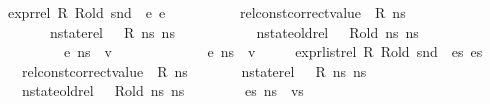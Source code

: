 \begin{isabellebody}
\ \ \ {\isachardoublequoteopen}expr{\isacharunderscore}{\kern0pt}rel\ R\ R{\isacharunderscore}{\kern0pt}old\ {\isacharparenleft}{\kern0pt}snd\ {\isasymLambda}{\isacharparenright}{\kern0pt}\ e{}\ e{}\ {\isasymLongrightarrow}\isanewline
\ \ \ \ \ \ \ \ \ rel{\isacharunderscore}{\kern0pt}const{\isacharunderscore}{\kern0pt}correct{\isacharunderscore}{\kern0pt}value\ {\isasymLambda}\ R\ ns{}\ {\isasymLongrightarrow}\ \isanewline
\ \ \ \ \ \ \ \ \ nstate{\isacharunderscore}{\kern0pt}rel\ {\isasymLambda}\ {\isasymLambda}{\isacharprime}{\kern0pt}\ R\ ns{}\ ns{}\ {\isasymLongrightarrow}\ \isanewline
\ \ \ \ \ \ \ \ \ nstate{\isacharunderscore}{\kern0pt}old{\isacharunderscore}{\kern0pt}rel\ {\isasymLambda}\ {\isasymLambda}{\isacharprime}{\kern0pt}\ R{\isacharunderscore}{\kern0pt}old\ ns{}\ ns{}\ {\isasymLongrightarrow}\isanewline
\ \ \ \ \ \ \ \ \ {\isasymLambda}{\isacharcomma}{\kern0pt}{\isasymGamma}{\isacharcomma}{\kern0pt}{\isasymOmega}\ {\isasymturnstile}\ {\isasymlangle}e{}{\isacharcomma}{\kern0pt}\ ns{}{\isasymrangle}\ {\isasymDown}\ v\ {\isasymLongrightarrow}\ \isanewline
\ \ \ \ \ \ \ \ \ {\isasymLambda}{\isacharprime}{\kern0pt}{\isacharcomma}{\kern0pt}{\isasymGamma}{\isacharcomma}{\kern0pt}{\isasymOmega}\ {\isasymturnstile}\ {\isasymlangle}e{}{\isacharcomma}{\kern0pt}\ ns{}{\isasymrangle}\ {\isasymDown}\ v{\isachardoublequoteclose}\ \isanewline
\ \ \ \ {\isachardoublequoteopen}expr{\isacharunderscore}{\kern0pt}list{\isacharunderscore}{\kern0pt}rel\ R\ R{\isacharunderscore}{\kern0pt}old\ {\isacharparenleft}{\kern0pt}snd\ {\isasymLambda}{\isacharparenright}{\kern0pt}\ es{}\ es{}\ {\isasymLongrightarrow}\isanewline
\ \ \ \ \ rel{\isacharunderscore}{\kern0pt}const{\isacharunderscore}{\kern0pt}correct{\isacharunderscore}{\kern0pt}value\ {\isasymLambda}\ R\ ns{}\ {\isasymLongrightarrow}\ \isanewline
\ \ \ \ \ nstate{\isacharunderscore}{\kern0pt}rel\ {\isasymLambda}\ {\isasymLambda}{\isacharprime}{\kern0pt}\ R\ ns{}\ ns{}\ {\isasymLongrightarrow}\ \isanewline
\ \ \ \ \ nstate{\isacharunderscore}{\kern0pt}old{\isacharunderscore}{\kern0pt}rel\ {\isasymLambda}\ {\isasymLambda}{\isacharprime}{\kern0pt}\ R{\isacharunderscore}{\kern0pt}old\ ns{}\ ns{}\ {\isasymLongrightarrow}\isanewline
\ \ \ \ \ {\isasymLambda}{\isacharcomma}{\kern0pt}{\isasymGamma}{\isacharcomma}{\kern0pt}{\isasymOmega}\ {\isasymturnstile}\ {\isasymlangle}es{}{\isacharcomma}{\kern0pt}\ ns{}{\isasymrangle}\ {\isacharbrackleft}{\kern0pt}{\isasymDown}{\isacharbrackright}{\kern0pt}\ vs\ {\isasymLongrightarrow}\ \isanewline

\end{isabellebody}
